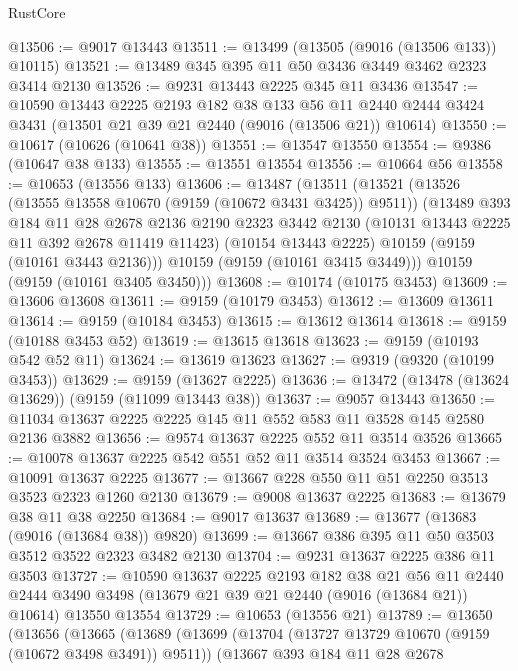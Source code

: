 \begin{lexlean}{RustCore}
\begin{coremodule}
@13506 := @9017 @13443
@13511 := @13499 (@13505 (@9016 (@13506 @133)) @10115)
@13521 := @13489 @345 @395 @11 @50 @3436 @3449 @3462 @2323 @3414 @2130
@13526 := @9231 @13443 @2225 @345 @11 @3436
@13547 := @10590
    @13443
    @2225
    @2193
    @182
    @38
    @133
    @56
    @11
    @2440
    @2444
    @3424
    @3431
    (@13501 @21 @39 @21 @2440 (@9016 (@13506 @21)) @10614)
@13550 := @10617 (@10626 (@10641 @38))
@13551 := @13547 @13550
@13554 := @9386 (@10647 @38 @133)
@13555 := @13551 @13554
@13556 := @10664 @56
@13558 := @10653 (@13556 @133)
@13606 := @13487
    (@13511
      (@13521
        (@13526 (@13555 @13558 @10670 (@9159 (@10672 @3431 @3425)) @9511))
        (@13489
          @393
          @184
          @11
          @28
          @2678
          @2136
          @2190
          @2323
          @3442
          @2130
          (@10131 @13443 @2225 @11 @392 @2678 @11419 @11423)
          (@10154 @13443 @2225)
          @10159
          (@9159 (@10161 @3443 @2136)))
        @10159
        (@9159 (@10161 @3415 @3449)))
      @10159
      (@9159 (@10161 @3405 @3450)))
@13608 := @10174 (@10175 @3453)
@13609 := @13606 @13608
@13611 := @9159 (@10179 @3453)
@13612 := @13609 @13611
@13614 := @9159 (@10184 @3453)
@13615 := @13612 @13614
@13618 := @9159 (@10188 @3453 @52)
@13619 := @13615 @13618
@13623 := @9159 (@10193 @542 @52 @11)
@13624 := @13619 @13623
@13627 := @9319 (@9320 (@10199 @3453))
@13629 := @9159 (@13627 @2225)
@13636 := @13472 (@13478 (@13624 @13629)) (@9159 (@11099 @13443 @38))
@13637 := @9057 @13443
@13650 := @11034 @13637 @2225 @2225 @145 @11 @552 @583 @11 @3528 @145 @2580 @2136 @3882
@13656 := @9574 @13637 @2225 @552 @11 @3514 @3526
@13665 := @10078 @13637 @2225 @542 @551 @52 @11 @3514 @3524 @3453
@13667 := @10091 @13637 @2225
@13677 := @13667 @228 @550 @11 @51 @2250 @3513 @3523 @2323 @1260 @2130
@13679 := @9008 @13637 @2225
@13683 := @13679 @38 @11 @38 @2250
@13684 := @9017 @13637
@13689 := @13677 (@13683 (@9016 (@13684 @38)) @9820)
@13699 := @13667 @386 @395 @11 @50 @3503 @3512 @3522 @2323 @3482 @2130
@13704 := @9231 @13637 @2225 @386 @11 @3503
@13727 := @10590
    @13637
    @2225
    @2193
    @182
    @38
    @21
    @56
    @11
    @2440
    @2444
    @3490
    @3498
    (@13679 @21 @39 @21 @2440 (@9016 (@13684 @21)) @10614)
    @13550
    @13554
@13729 := @10653 (@13556 @21)
@13789 := @13650
    (@13656
      (@13665
        (@13689
          (@13699
            (@13704 (@13727 @13729 @10670 (@9159 (@10672 @3498 @3491)) @9511))
            (@13667
              @393
              @184
              @11
              @28
              @2678

\end{coremodule}
\end{lexlean}
